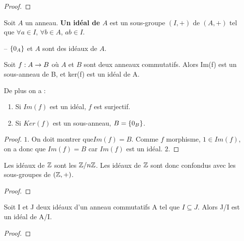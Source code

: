\ifdefined\outputproof
\begin{proof}

\end{proof}
\fi

\begin{definition}
	Soit $A$ un anneau. \textbf{Un idéal de $A$} est un sous-groupe $(I, +)$ de
	$(A, +)$ tel que $\forall a \in I$, $\forall b \in A$, $ab \in I$.
\end{definition}

\begin{exemple}
	-- $\left\{ 0_{A} \right\}$ et $A$ sont des idéaux de $A$.
\end{exemple}

\begin{proposition}
	Soit $f : A \rightarrow B$ où $A$ et $B$ sont deux anneaux commutatifs. Alors
	Im(f) est un sous-anneau de B, et ker(f) est un idéal de A.

	De plus on a :
	\begin{enumerate}
		\item Si $Im(f)$ est un idéal, $f$ est surjectif.
		\item Si $Ker(f)$ est un sous-anneau, $B = \left\{ 0_{B} \right\}$.
	\end{enumerate}
\end{proposition}

\ifdefined\outputproof
\begin{proof}
	$1$. On doit montrer que$ Im(f) = B$. Comme $f$ morphisme, $1 \in Im(f)$, on a
	donc que $Im(f) = B$ car $Im(f)$ est un idéal.
	$2$.
\end{proof}
\fi

\begin{proposition}
	Les idéaux de $\mathbb{Z}$ sont les $\mathbb{Z}/n\mathbb{Z}$. Les idéaux de
	$\mathbb{Z}$ sont donc confondus avec les sous-groupes de $(\mathbb{Z}, +)$.
\end{proposition}

\ifdefined\outputproof
\begin{proof}

\end{proof}
\fi

\begin{proposition}
	Soit I et J deux idéaux d'un anneau commutatifs A tel que $I \subseteq J$.
	Alors J/I est un idéal de A/I.
\end{proposition}

\ifdefined\outputproof
\begin{proof}

\end{proof}
\fi

